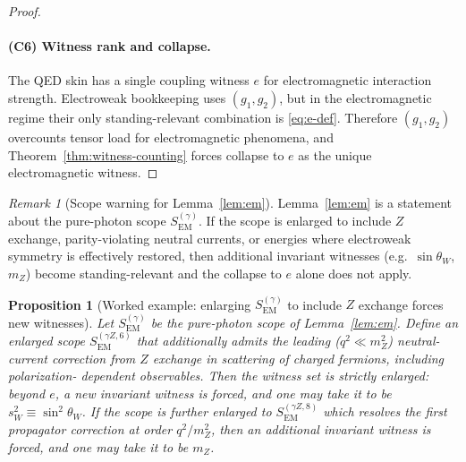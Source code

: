 \documentclass[11pt]{article}
\newtheorem{proposition}[definition]{Proposition}
\theoremstyle{remark}
\newtheorem{remark}[definition]{Remark}
\newcommand{\EM}{\ensuremath{\mathrm{EM}}}
\begin{document}
\begin{proof}
\paragraph{(C6) Witness rank and collapse.}
The QED skin has a single coupling witness $e$ for electromagnetic interaction strength.
Electroweak bookkeeping uses $(g_1,g_2)$, but in the electromagnetic regime their only standing-relevant
combination is \eqref{eq:e-def}. Therefore $(g_1,g_2)$ overcounts tensor load for electromagnetic phenomena,
and Theorem~\ref{thm:witness-counting} forces collapse to $e$ as the unique electromagnetic witness.
\end{proof}

\begin{remark}[Scope warning for Lemma~\ref{lem:em}]\label{rem:em-scope}
Lemma~\ref{lem:em} is a statement about the pure-photon scope $S_{\EM}^{(\gamma)}$.
If the scope is enlarged to include $Z$ exchange, parity-violating neutral currents, or energies where
electroweak symmetry is effectively restored, then additional invariant witnesses (e.g.\ $\sin\theta_W$,
$m_Z$) become standing-relevant and the collapse to $e$ alone does not apply.
\end{remark}

\begin{proposition}[Worked example: enlarging $S_{\EM}^{(\gamma)}$ to include $Z$ exchange forces new witnesses]
\label{prop:em-Z}
Let $S_{\EM}^{(\gamma)}$ be the pure-photon scope of Lemma~\ref{lem:em}.
Define an enlarged scope $S_{\EM}^{(\gamma Z,6)}$ that additionally admits the leading ($q^2\ll m_Z^2$)
neutral-current correction from $Z$ exchange in scattering of charged fermions, including polarization-
dependent observables. Then the witness set is strictly enlarged: beyond $e$, a new invariant witness is
forced, and one may take it to be $s_W^2\equiv\sin^2\theta_W$.
If the scope is further enlarged to $S_{\EM}^{(\gamma Z,8)}$ which resolves the first propagator correction
at order $q^2/m_Z^2$, then an additional invariant witness is forced, and one may take it to be $m_Z$.
\end{proposition}
\end{document}
